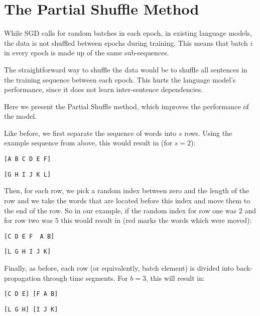 \documentclass[11pt,a4paper]{article}
\begin{document}
\section{The Partial Shuffle Method}
While SGD calls for random batches in each epoch, in existing language models, the data is not shuffled between epochs during training. This means that batch $i$ in every epoch is made up of the same sub-sequences.

The straightforward way to shuffle the data would be to shuffle all sentences in the training sequence between each epoch. This hurts the language model's performance, since it does not learn inter-sentence dependencies.  

Here we present the Partial Shuffle method, which improves the performance of the model.

Like before, we first separate the sequence of words into $s$ rows. Using the example sequence from above, this would result in (for $s=2$):

\texttt{[A B C D E F]}

\texttt{[G H I J K L]}

Then, for each row, we pick a random index between zero and the length of the row and we take the words that are located before this index and move them to the end of the row. So in our example, if the random index for row one was $2$ and for row two was $5$ this would result in (red marks the words which were moved):


\texttt{[C D E F {\color{red} A B}]}

\texttt{[L {\color{red}G H} {\color{red}I J K}]}

Finally, as before, each row (or equivalently, batch element) is divided into back-propagation through time segments. For $b = 3$, this will result in:

\texttt{[C D E] [F A B]}

\texttt{[L G H] [I J K]}
\end{document}
